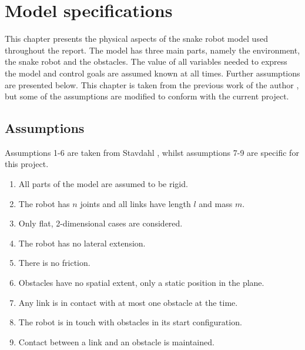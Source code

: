 \chapter{Model specifications} \label{ch:model_specs}

This chapter presents the physical aspects of the snake robot model used throughout the report. The model has three main parts, namely the environment, the snake robot and the obstacles. The value of all variables needed to express the model and control goals are assumed known at all times. Further assumptions are presented below. This chapter is taken from the previous work of the author \cite{AtussaProsjektoppgp}, but some of the assumptions are modified to conform with the current project.

\section{Assumptions}\label{seq:assumptions}

Assumptions 1-6 are taken from Stavdahl \cite{StavdahlNote}, whilst assumptions 7-9 are specific for this project.

\begin{enumerate}
    \item All parts of the model are assumed to be rigid.
    \item The robot has $n$ joints and all links have length $l$ and mass $m$.
    \item Only flat, 2-dimensional cases are considered.
    \item The robot has no lateral extension.
    \item There is no friction. 
    \item Obstacles have no spatial extent, only a static position in the plane.
    \item Any link is in contact with at most one obstacle at the time.
    \item The robot is in touch with obstacles in its start configuration.
    \item Contact between a link and an obstacle is maintained.
\end{enumerate}



